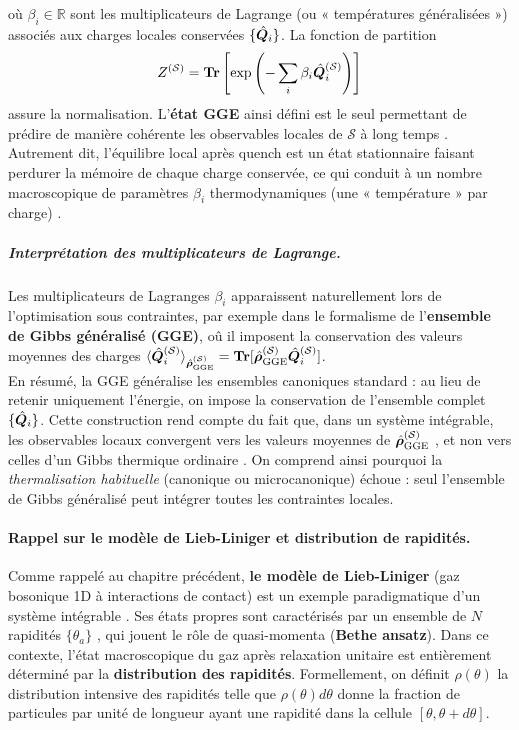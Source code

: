 où $\beta_i \in \mathbb{R}$ sont les multiplicateurs de Lagrange (ou « températures généralisées ») associés aux charges locales conservées $\{\hat{\bm{Q}}_i\}$. La fonction de partition 
\begin{eqnarray}
	Z^{(\mathcal{S})} = \bm{\mathrm{Tr}}\left [\exp \left( - \sum_i \beta_i \hat{\bm{Q}}_i^{(\mathcal{S})} \right ) \right ]  \label{chap.TBA.op.Z.S}	
\end{eqnarray}
 assure la normalisation. L’{\bf état GGE} ainsi défini est le seul permettant de prédire de manière cohérente les observables locales de $\mathcal{S}$ à long temps \cite{??}. Autrement dit, l’équilibre local après quench est un état stationnaire faisant perdurer la mémoire de chaque charge conservée, ce qui conduit à un nombre macroscopique de paramètres $\beta_i$ thermodynamiques (une « température » par charge) \cite{??}.

 \subparagraph{Interprétation des multiplicateurs de Lagrange.}
Les multiplicateurs de Lagranges $\beta_i$ apparaissent naturellement lors de l'optimisation sous contraintes, par exemple dans le formalisme de l'{\bf ensemble de Gibbs généralisé (GGE)}, oû il imposent la conservation des valeurs moyennes des charges $\langle \hat{\bm{Q}}_i^{(\mathcal{S})} \rangle_{\hat{\bm{\rho}}^{(\mathcal{S})}_{\mathrm{GGE}}} = \bm{\mathrm{Tr}}[\hat{\bm{\rho}}^{(\mathcal{S})}_{\mathrm{GGE}} \hat{\bm{Q}}_i^{(\mathcal{S})}]   $.\\

En résumé, la GGE généralise les ensembles canoniques standard : au lieu de retenir uniquement l’énergie, on impose la conservation de l’ensemble complet $\{\hat{\bm{Q}}_i \}$. Cette construction rend compte du fait que, dans un système intégrable, les observables locaux convergent vers les valeurs moyennes de $\hat{\bm{\rho}}^{(\mathcal{S})}_{\mathrm{GGE}}$ , et non vers celles d’un Gibbs thermique ordinaire \cite{??}\cite{??}. On comprend ainsi pourquoi la {\em thermalisation habituelle} (canonique ou microcanonique) échoue : seul l’ensemble de Gibbs généralisé peut intégrer toutes les contraintes locales.

\paragraph{Rappel sur le modèle de Lieb-Liniger et distribution de rapidités.}
Comme rappelé au chapitre précédent, {\bf le modèle de  Lieb-Liniger} (gaz bosonique 1D à interactions de contact) est un exemple paradigmatique d’un système intégrable \cite{??}. Ses états propres sont caractérisés par un ensemble de $N$  rapidités $\{ \theta_a \}$ , qui jouent le rôle de quasi-momenta ({\bf Bethe ansatz}). Dans ce contexte, l’état macroscopique du gaz après relaxation unitaire est entièrement déterminé par la {\bf distribution des rapidités}. Formellement, on définit $\rho(\theta)$ la distribution intensive des rapidités telle que $\rho(\theta) d \theta$ donne la fraction de particules par unité de longueur ayant une rapidité dans la cellule $[\theta , \theta + d \theta ] $.\\

